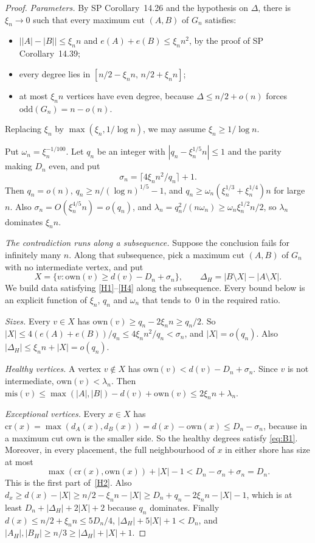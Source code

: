 \documentclass[11pt]{article}
\theoremstyle{definition}
\newcommand{\own}{\mathrm{own}}
\newcommand{\cro}{\mathrm{cr}}
\newcommand{\mis}{\mathrm{mis}}
\newcommand{\odd}{\mathrm{odd}}
\begin{document}
\begin{proof}
\emph{Parameters.} By SP Corollary~14.26 and the hypothesis on $\Delta$, there is $\xi_n\to0$ such that every maximum cut $(A,B)$ of $G_n$ satisfies:
\begin{itemize}[nosep]
\item $\bigl||A|-|B|\bigr|\le\xi_nn$ and $e(A)+e(B)\le\xi_nn^2$, by the proof of SP Corollary~14.39;
\item every degree lies in $[n/2-\xi_nn,\,n/2+\xi_nn]$;
\item at most $\xi_nn$ vertices have even degree, because $\Delta\le n/2+o(n)$ forces $\odd(G_n)=n-o(n)$.
\end{itemize}
Replacing $\xi_n$ by $\max(\xi_n,1/\log n)$, we may assume $\xi_n\ge1/\log n$.

Put $\omega_n=\xi_n^{-1/100}$. Let $q_n$ be an integer with $|q_n-\xi_n^{1/5}n|\le1$ and the parity making $D_n$ even, and put
\[
\sigma_n=\lceil4\xi_nn^2/q_n\rceil+1 .
\]
Then $q_n=o(n)$, $q_n\ge n/(\log n)^{1/5}-1$, and $q_n\ge\omega_n(\xi_n^{1/3}+\xi_n^{1/4})n$ for large $n$. Also $\sigma_n=O(\xi_n^{4/5}n)=o(q_n)$, and $\lambda_n=q_n^2/(n\omega_n)\ge\omega_n\xi_n^{1/2}n/2$, so $\lambda_n$ dominates $\xi_nn$.

\emph{The contradiction runs along a subsequence.} Suppose the conclusion fails for infinitely many $n$. Along that subsequence, pick a maximum cut $(A,B)$ of $G_n$ with no intermediate vertex, and put
\[
X=\{v:\own(v)\ge d(v)-D_n+\sigma_n\},\qquad\Delta_H=|B\setminus X|-|A\setminus X| .
\]
We build data satisfying \ref{H1}--\ref{H4} along the subsequence. Every bound below is an explicit function of $\xi_n$, $q_n$ and $\omega_n$ that tends to~$0$ in the required ratio.

\emph{Sizes.} Every $v\in X$ has $\own(v)\ge q_n-2\xi_nn\ge q_n/2$. So $|X|\le4(e(A)+e(B))/q_n\le4\xi_nn^2/q_n<\sigma_n$, and $|X|=o(q_n)$. Also $|\Delta_H|\le\xi_nn+|X|=o(q_n)$.

\emph{Healthy vertices.} A vertex $v\notin X$ has $\own(v)<d(v)-D_n+\sigma_n$. Since $v$ is not intermediate, $\own(v)<\lambda_n$. Then $\mis(v)\le\max(|A|,|B|)-d(v)+\own(v)\le2\xi_nn+\lambda_n$.

\emph{Exceptional vertices.} Every $x\in X$ has $\cro(x)=\max(d_A(x),d_B(x))=d(x)-\own(x)\le D_n-\sigma_n$, because in a maximum cut $\own$ is the smaller side. So the healthy degrees satisfy \eqref{eq:B1}. Moreover, in every placement, the full neighbourhood of $x$ in either shore has size at most
\[
\max(\cro(x),\own(x))+|X|-1<D_n-\sigma_n+\sigma_n=D_n .
\]
This is the first part of~\ref{H2}. Also $d_x\ge d(x)-|X|\ge n/2-\xi_nn-|X|\ge D_n+q_n-2\xi_nn-|X|-1$, which is at least $D_n+|\Delta_H|+2|X|+2$ because $q_n$ dominates. Finally $d(x)\le n/2+\xi_nn\le5D_n/4$, $|\Delta_H|+5|X|+1<D_n$, and $|A_H|,|B_H|\ge n/3\ge|\Delta_H|+|X|+1$.


\end{proof}
\end{document}
